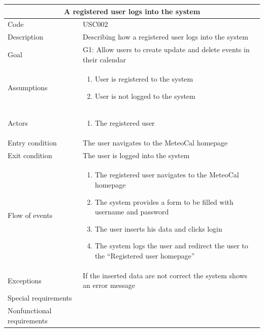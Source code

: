 \documentclass[10pt,a4paper,titlepage]{article}
\begin{document}
\begin{tabular}[h]{| p{3cm} | p{10cm} |}
\hline \multicolumn{2}{|c|}{\textbf{A registered user logs into the system}} \\ 
\hline Code & USC002 \\ 
\hline Description & Describing how a registered user logs into the system \\
\hline Goal & G1: Allow users to create update and delete events in their calendar \\
\hline Assumptions  & \begin{enumerate}
\item User is registered to the system
\item User is not logged to the system
\end{enumerate} \\
\hline Actors &  \begin{enumerate}
\item The registered user
\end{enumerate} \\
\hline Entry condition & The user navigates to the MeteoCal homepage\\
\hline Exit condition & The user is logged into the system \\
\hline Flow of events & \begin{enumerate}
\item The registered user navigates to the MeteoCal homepage
\item The system provides a form to be filled with username and password
\item The user inserts his data and clicks login
\item The system logs the user and redirect the user to the “Registered user homepage”
\end{enumerate}\\
\hline Exceptions & If the inserted data are not correct the system shows an error message \\
\hline Special requirements & \\
\hline Nonfunctional requirements &  \\
\hline
\end{tabular}
\end{document}
